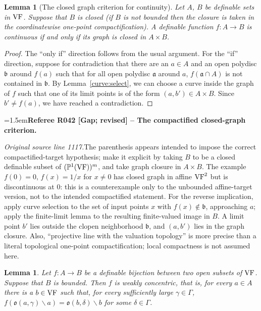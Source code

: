 \documentclass[12pt]{amsart}
\newcommand{\RefereeRemark}[4]{%
  \par\medskip\begingroup\normalfont\small\color{RefereePurple}%
  \emergencystretch=1.5em\noindent\textbf{Referee R#1 [#2] -- #3.}\par\nobreak\noindent #4\par
  \endgroup\medskip
}
\theoremstyle{plain}
\newtheorem{lem}[thm]{Lemma}
\theoremstyle{definition}
\theoremstyle{remark}
\numberwithin{equation}{section}
\theoremstyle{plain}
\newcommand{\VF}{\textup{VF}}
\newcommand{\ga}{\mathfrak{a}}
\newcommand{\gb}{\mathfrak{b}}
\newcommand{\go}{\mathfrak{o}}
\newcommand{\0}{\emptyset}
\newcommand{\fun}{\longrightarrow}
\newcommand{\mi}{\smallsetminus}
\begin{document}
\begin{lem}[The closed graph criterion for continuity]\label{closed:gra}
Let $A$, $B$ be definable sets in $\VF$. Suppose that $B$ is closed (if $B$ is not bounded then the  closure is taken in the coordinatewise one-point compactification). A definable function $f : A \fun B$ is continuous if and only if its graph  is closed in $A \times B$.
\end{lem}
\begin{proof}
The ``only if'' direction follows from the usual argument. For the ``if'' direction, suppose for contradiction that there are an $a \in A$ and an open polydisc $\gb$ around $f(a)$ such that for all open polydisc $\ga$ around $a$, $f(\ga \cap A)$ is not contained in $\gb$. By Lemma~\ref{curve:select}, we can choose a curve inside the graph of $f$ such that one of its limit points is of the form $(a, b') \in A \times B$. Since $b' \neq f(a)$, we have reached a contradiction.
\end{proof}

\RefereeRemark{042}{Gap; revised}{The compactified closed-graph criterion}{%
\textit{Original source line 1117.}\quad The parenthesis appears intended to impose the correct compactified-target hypothesis; make it explicit by taking $B$ to be a closed definable subset of $(\mathbb P^1(\VF))^m$, and take graph closure in $A\times B$. The example $f(0)=0$, $f(x)=1/x$ for $x\ne0$ has closed graph in affine $\VF^2$ but is discontinuous at $0$: this is a counterexample only to the unbounded affine-target version, not to the intended compactified statement. For the reverse implication, apply curve selection to the set of input points $x$ with $f(x)\notin\gb$, approaching $a$; apply the finite-limit lemma to the resulting finite-valued image in $B$. A limit point $b'$ lies outside the clopen neighborhood $\gb$, and $(a,b')$ lies in the graph closure. Also, ``projective line with the valuation topology'' is more precise than a literal topological one-point compactification; local compactness is not assumed here.
}


\begin{lem}\label{lim:weak}
Let $f : A  \fun B$ be a definable bijection between two open subsets of $\VF$. Suppose that $B$ is bounded. Then $f$ is weakly concentric, that is, for every $a \in A$ there is a $b \in \VF$ such that, for every sufficiently large $\gamma \in \Gamma$, $f(\go(a, \gamma) \mi a) = \go(b, \delta) \mi b$ for some $\delta \in \Gamma$.
\end{lem}
\end{document}

